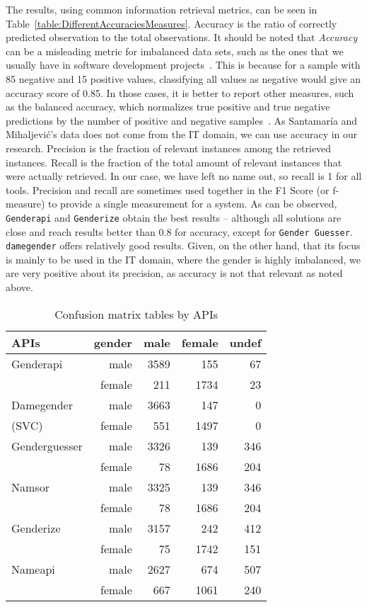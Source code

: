 \documentclass[a4paper]{article}
\begin{document}
The results, using common information retrieval metrics, can be seen in Table~\ref{table:DifferentAccuraciesMeasures}.
Accuracy is the ratio of correctly predicted observation to the total observations.
It should be noted that \emph{Accuracy} can be a misleading metric for imbalanced data sets, such as the ones that we usually have in software development projects~\cite{ghosh2002free}.
This is because for a sample with 85 negative and 15 positive values, classifying all values as negative would give an accuracy score of 0.85.
In those cases, it is better to report other measures, such as the balanced accuracy, which normalizes true positive and true negative predictions by the number of positive and negative samples~\cite{mower2005prep}.
As Santamaría and Mihaljevi\'c's data does not come from the IT domain, we can use accuracy in our research.
Precision is the fraction of relevant instances among the retrieved instances.
Recall is the fraction of the total amount of relevant instances that were actually retrieved.
In our case, we have left no name out, so recall is 1 for all tools.
Precision and recall are sometimes used together in the F1 Score (or f-measure) to provide a single measurement for a system.
As can be observed, \texttt{Genderapi} and \texttt{Genderize} obtain the best results -- although all solutions are close and reach results better than 0.8 for accuracy, except for \texttt{Gender Guesser}.
\texttt{damegender} offers relatively good results.
Given, on the other hand, that its focus is mainly to be used in the IT domain, where the gender is highly imbalanced, we are very positive about its precision, as accuracy is not that relevant as noted above.




\begin{table}[t]
\footnotesize
\begin{tabular}[]{lrrrr}
  \hline
  APIs          & gender & male & female & undef \tabularnewline
\hline
Genderapi         & male    & 3589 & 155  &  67 \tabularnewline
                  & female  & 211  & 1734 &  23 \tabularnewline
Damegender       & male    & 3663 & 147  &   0 \tabularnewline
(SVC)\footnotemark[1] & female  & 551  & 1497 &   0 \tabularnewline
Genderguesser     & male    & 3326 &  139 & 346 \tabularnewline
                  & female  & 78   & 1686 & 204 \tabularnewline
Namsor            & male    & 3325 & 139  & 346 \tabularnewline
                  & female  & 78   & 1686 & 204 \tabularnewline
Genderize         & male    & 3157 & 242  & 412 \tabularnewline
                  & female  & 75   & 1742 & 151 \tabularnewline
Nameapi           & male    & 2627 & 674  & 507 \tabularnewline
                  & female  & 667  & 1061 & 240 \tabularnewline 
\hline
\end{tabular}
\caption{Confusion matrix tables by APIs}
\label{table:ConfusionMatrixTables}
\end{table}
\end{document}
